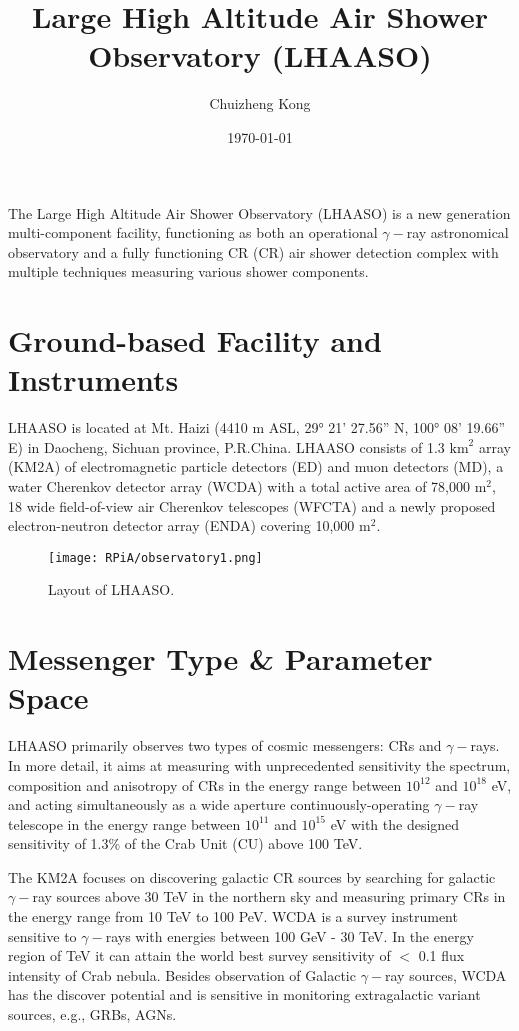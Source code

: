 \documentclass[UTF8, 11pt]{article}
\title{Large High Altitude Air Shower Observatory (LHAASO)}
\author{Chuizheng Kong}
\date{\today}
\newcommand{\mr}{\mathrm}
\begin{document}
\maketitle

The Large High Altitude Air Shower Observatory (LHAASO) is a new generation multi-component facility, functioning as both an operational $\gamma-$ray astronomical observatory and a fully functioning CR (CR) air shower detection complex with multiple techniques measuring various shower components.

\section{Ground-based Facility and Instruments}

LHAASO is located at Mt. Haizi (4410 m ASL, 29° 21’ 27.56” N, 100° 08’ 19.66” E) in Daocheng, Sichuan province, P.R.China\cite{cao2022largehighaltitudeair}. LHAASO consists of 1.3 $\mr{km}^2$ array (KM2A) of electromagnetic particle detectors (ED) and muon detectors (MD), a water Cherenkov detector array (WCDA) with a total active area of 78,000 $\mr{m}^2$, 18 wide field-of-view air Cherenkov telescopes (WFCTA) and a newly proposed electron-neutron detector array (ENDA) covering 10,000 $\mr{m}^2$.

\begin{figure}
\centering
\texttt{[image: RPiA/observatory1.png]}
\caption{Layout of LHAASO\cite{cao2022largehighaltitudeair}.}
\end{figure}

\section{Messenger Type \& Parameter Space}

LHAASO primarily observes two types of cosmic messengers: CRs and $\gamma-$rays. In more detail\cite{cao2022largehighaltitudeair}, it aims at measuring with unprecedented sensitivity the spectrum, composition and anisotropy of CRs in the energy range between $10^{12}$ and $10^{18}$ eV, and acting simultaneously as a wide aperture continuously-operating $\gamma-$ray telescope in the energy range between $10^{11}$ and $10^{15}$ eV with the designed sensitivity of 1.3\% of the Crab Unit (CU) above 100 TeV.

The KM2A focuses on discovering galactic CR sources by searching for galactic $\gamma-$ray sources above 30 TeV in the northern sky and measuring primary CRs in the energy range from 10 TeV to 100 PeV. WCDA is a survey instrument sensitive to $\gamma-$rays with energies between 100 GeV - 30 TeV. In the energy region of TeV it can attain the world best survey sensitivity of $<$ 0.1 flux intensity of Crab nebula. Besides observation of Galactic $\gamma-$ray sources, WCDA has the discover potential and is sensitive in monitoring extragalactic variant sources, e.g., GRBs, AGNs.
\end{document}
